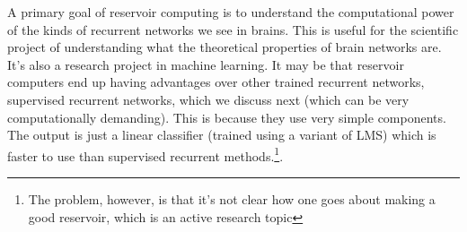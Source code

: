 A primary goal of reservoir computing is to understand the computational power of the kinds of recurrent networks we see in brains. This is useful for the scientific project of understanding what the theoretical properties of brain networks are. It's also a research project in machine learning. It may be that reservoir computers end up having advantages over other trained recurrent networks, \eg supervised recurrent networks, which we discuss next (which can be very computationally demanding). This is because they use very simple components. The output is just a linear classifier (trained using a variant of LMS) which is faster to use than supervised recurrent methods.\footnote{The problem, however, is that it's not clear how one goes about making a good reservoir, which is an active research topic}.
	